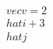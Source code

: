 \documentclass[preview]{standalone}
\begin{document}
\begin{align*}
\quad\\vec{v} = 2\quad\\hat{i} + 3\quad\\hat{j}
\end{align*}
\end{document}
